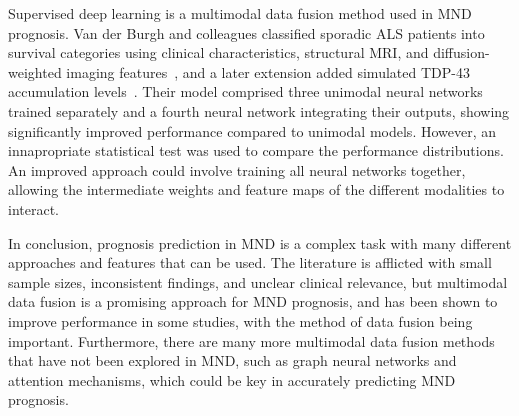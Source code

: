 Supervised deep learning is a multimodal data fusion method used in MND prognosis.
Van der Burgh and colleagues classified sporadic ALS patients into survival categories using clinical characteristics, structural MRI, and diffusion-weighted imaging features~\cite{vanderburghDeepLearningPredictions2017}, and a later extension added simulated TDP-43 accumulation levels~\cite{meierConnectomeBasedPropagation2020}.
Their model comprised three unimodal neural networks trained separately and a fourth neural network integrating their outputs, showing significantly improved performance compared to unimodal models.
However, an innapropriate statistical test was used to compare the performance distributions.
An improved approach could involve training all neural networks together, allowing the intermediate weights and feature maps of the different modalities to interact.

In conclusion, prognosis prediction in MND is a complex task with many different approaches and features that can be used.
The literature is afflicted with small sample sizes, inconsistent findings, and unclear clinical relevance, but multimodal data fusion is a promising approach for MND prognosis, and has been shown to improve performance in some studies, with the method of data fusion being important.
Furthermore, there are many more multimodal data fusion methods that have not been explored in MND, such as graph neural networks and attention mechanisms, which could be key in accurately predicting MND prognosis.
